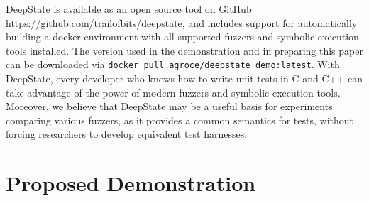 \documentclass[sigconf]{acmart}
\begin{document}
DeepState is available as an open source tool on GitHub \url{https://github.com/trailofbits/deepstate}, and includes support for automatically building a docker environment with all supported fuzzers and symbolic execution tools installed.  The version used in the demonstration and in preparing this paper can be downloaded via {\tt docker pull agroce/deepstate\_demo:latest}.  With DeepState, every developer who knows how to write unit tests in C and C++ can take advantage of the power of modern fuzzers and symbolic execution tools.  Moreover, we believe that DeepState may be a useful basis for experiments comparing various fuzzers, as it provides a common semantics for tests, without forcing researchers to develop equivalent test harnesses.




\newpage

\appendix
\section{Proposed Demonstration}
\end{document}
